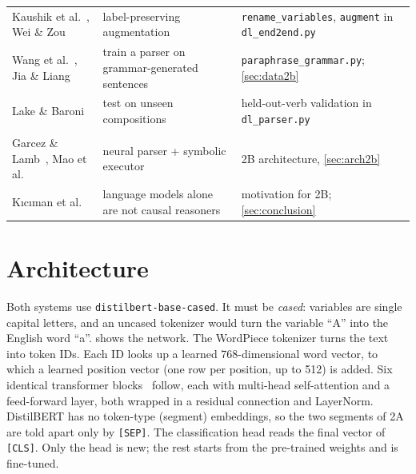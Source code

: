 \documentclass[12pt,a4paper]{article}
\newcommand{\code}[1]{\texttt{#1}}
\begin{document}
\begin{longtable}{@{}>{\raggedright}p{2.4cm}>{\raggedright}p{6.1cm}>{\raggedright\arraybackslash}p{5.8cm}@{}}
\rowcolor{rowtint} Kaushik et al.~\cite{kaushik2020}, Wei \& Zou~\cite{wei2019} & label-preserving augmentation & \code{rename\_variables}, \code{augment} in \code{dl\_end2end.py} \\
Wang et al.~\cite{wang2015}, Jia \& Liang~\cite{jia2016} & train a parser on grammar-generated sentences & \code{paraphrase\_grammar.py}; \cref{sec:data2b} \\
\rowcolor{rowtint} Lake \& Baroni~\cite{lake2018} & test on unseen compositions & held-out-verb validation in \code{dl\_parser.py} \\
\multicolumn{3}{@{}l}{\textit{Hybrid design}}\\
Garcez \& Lamb~\cite{garcez2023}, Mao et al.~\cite{mao2019} & neural parser + symbolic executor & 2B architecture, \cref{sec:arch2b} \\
\rowcolor{rowtint} K{\i}c{\i}man et al.~\cite{kiciman2023} & language models alone are not causal reasoners & motivation for 2B; \cref{sec:conclusion} \\
\bottomrule
\end{longtable}
\endgroup

\section{Architecture}\label{sec:arch}

Both systems use \code{distilbert-base-cased}. It must be \emph{cased}: variables are single capital letters, and an
uncased tokenizer would turn the variable ``A'' into the English word ``a''.
 shows the network. The WordPiece tokenizer turns the text into token IDs. Each ID looks up a learned
768-dimensional word vector, to which a learned position vector (one row per position, up to 512) is added.
Six identical transformer blocks~\cite{vaswani2017} follow, each with multi-head self-attention and a feed-forward
layer, both wrapped in a residual connection and LayerNorm. DistilBERT has no token-type (segment) embeddings, so the two
segments of 2A are told apart only by \code{[SEP]}. The classification head reads the final vector of \code{[CLS]}.
Only the head is new; the rest starts from the pre-trained weights and is fine-tuned.
\end{document}
